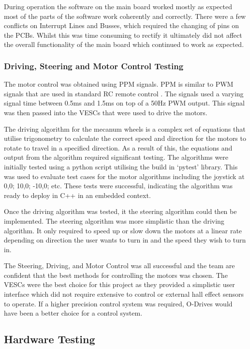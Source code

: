 \documentclass [12pt]{article}
\begin{document}
During operation the software on the main board worked mostly as expected most of the parts of the software work coherently and correctly. There were a few conflicts on Interrupt Lines and Busses, which required the changing of pins on the PCBs. Whilst this was time consuming to rectify it ultimately did not affect the overall functionality of the main board which continued to work as expected. 

\subsubsection{Driving, Steering and Motor Control Testing}
The motor control was obtained using PPM signals. PPM is similar to PWM signals that are used in standard RC remote control \cite{ppm}. The signals used a varying signal time between 0.5ms and 1.5ms on top of a 50Hz PWM output. This signal was then passed into the VESCs that were used to drive the motors. 

The driving algorithm for the mecanum wheels is a complex set of equations that utilise trigonometry to calculate the correct speed and direction for the motors to rotate to travel in a specified direction. As a result of this, the equations and output from the algorithm required significant testing. The algorithms were initially tested using a python script utilising the build in ‘pytest’ library. This was used to evaluate test cases for the motor algorithms including the joystick at 0,0; 10,0; -10,0; etc. These tests were successful, indicating the algorithm was ready to deploy in C++ in an embedded context. 

Once the driving algorithm was tested, it the steering algorithm could then be implemented. The steering algorithm was more simplistic than the driving algorithm. It only required to speed up or slow down the motors at a linear rate depending on direction the user wants to turn in and the speed they wish to turn in. 

The Steering, Driving, and Motor Control was all successful and the team are confident that the best methods for controlling the motors was chosen. The VESCs were the best choice for this project as they provided a simplistic user interface which did not require extensive to control or external hall effect sensors to operate. If a higher precision control system was required, O-Drives would have been a better choice for a control system. 

\subsection{Hardware Testing}
\end{document}
